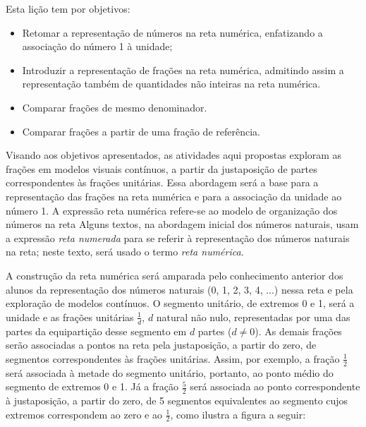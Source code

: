 

\noindent {\color{special}{\Large \bf LIÇÃO 3 - Para o professor}}
\vspace{.5cm}

Esta lição tem por objetivos: 
\begin{itemize}
 \item Retomar a representação de números na reta numérica, enfatizando a associação do número 1 à unidade;
 \item Introduzir a representação de frações na reta numérica, admitindo assim a representação também de quantidades não inteiras na reta numérica.
 \item Comparar frações de mesmo denominador.
 \item Comparar frações a partir de uma fração de referência.
\end{itemize}

Visando aos objetivos apresentados, as atividades aqui propostas exploram as frações em modelos visuais contínuos, a partir da justaposição de partes correspondentes às frações unitárias. Essa abordagem será a base para a representação das frações na reta numérica e para a associação da unidade ao número 1.  A expressão reta numérica refere-se ao modelo de organização dos números na reta Alguns textos, na abordagem inicial dos números naturais, usam a expressão {\it reta numerada} para se referir à representação dos números naturais na reta; neste texto, será usado o termo {\it reta numérica}. 

A construção da reta numérica será amparada pelo conhecimento anterior dos alunos da representação dos números naturais (0, 1, 2, 3, 4, ...) nessa reta e pela exploração de modelos contínuos. O segmento unitário, de extremos 0 e 1, será a unidade e as frações unitárias $\frac{1}{d}$, $d$ natural não nulo, representadas por uma das partes da equipartição desse segmento em $d$ partes ($d\neq0$). As demais frações serão associadas a pontos na reta pela justaposição, a partir do zero, de segmentos correspondentes às frações unitárias. Assim, por exemplo, a fração $\frac{1}{2}$ será associada à metade do segmento unitário, portanto, ao ponto médio do segmento de extremos 0 e 1. Já a fração $\frac{5}{2}$ será associada ao ponto correspondente à justaposição, a partir do zero, de 5 segmentos equivalentes ao segmento cujos extremos correspondem ao zero e ao $\frac{1}{2}$, como ilustra a figura a seguir:

